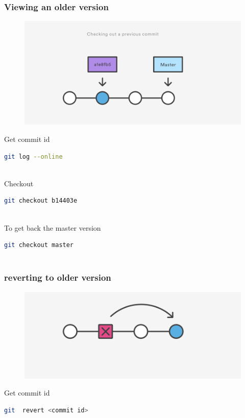 \documentclass[10pt,a4paper]{beamer}
\begin{document}
\begin{frame}[fragile]
\frametitle{ Viewing an older version }

  
 
\begin{figure}
  \includegraphics[scale=.3]{21}
 \end{figure}
  
  Get commit id 
  \begin{lstlisting}[language=bash]
 git log --online
 
\end{lstlisting}

Checkout 
    \begin{lstlisting}[language=bash]
 git checkout b14403e
 
\end{lstlisting}

To get back the master version
   \begin{lstlisting}[language=bash]
 git checkout master
 
\end{lstlisting}

\end{frame}
 
\begin{frame}[fragile]
\frametitle{ reverting to older version }

\begin{figure}
  \includegraphics[scale=.3]{22}
 \end{figure}
  
  Get commit id 
  \begin{lstlisting}[language=bash]
 git  revert <commit id>
 
\end{lstlisting}


\end{frame}
\end{document}
